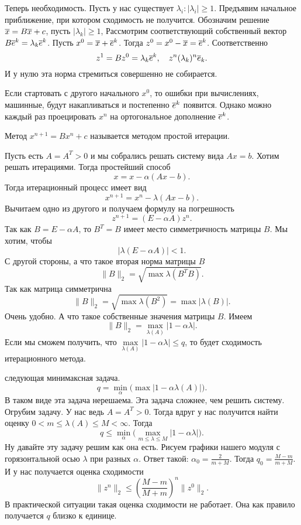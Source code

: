 \begin{Proof}
Теперь необходимость. Пусть у нас существует $\lambda_i\colon |\lambda_i|\ge 1$. Предъявим начальное приближение, при котором сходимость не получится. Обозначим решение $\overline{x} = B\overline{x} + c$, пусть $|\lambda_k|\ge 1$, Рассмотрим соответствующий собственный вектор $B\overline{e}^k = \lambda_k \overline{e}^k$. Пусть $x^0 = \overline{x} + \overline{e}^k$. Тогда $z^0 = x^0 - \overline{x} = \overline{e}^k$. Соответственно
\[
  z^1 = Bz^0 = \lambda_k \overline{e}^k,\quad z^n (\lambda_k)^n \overline{e}_k.
\]
И у нулю эта норма стремиться совершенно не собирается.

\end{Proof}
Если стартовать с другого начального $x^0$, то ошибки при вычислениях, машинные, будут накапливаться и постепенно $\overline{e}^k$ появится. Однако можно каждый раз проецировать $x^n$ на ортогональное дополнение $\overline{e}^k$.

Метод $x^{n+1} = Bx^n + c$ называется методом простой итерации.

Пусть есть $A = A^T>0$ и мы собрались решать систему вида $Ax = b$. Хотим решать итерациями. Тогда простейший способ
\[
  x = x - \alpha (Ax -b).
\]
Тогда итерационный процесс имеет вид
\[
  x^{n+1} = x^n - \lambda(Ax - b).
\]
Вычитаем одно из другого и получаем формулу на погрешность
\[
  z^{n+1} = (E- \alpha A)z^n.
\]
Так как $B = E-\alpha A$, то $B^T=B$ имеет место симметричность матрицы $B$. Мы хотим, чтобы
\[
  \big|\lambda(E-\alpha A)\big|<1.
\]
С другой стороны, а что такое вторая норма матрицы $B$
\[
  \|B\|_2 = \sqrt{\max\lambda(B^TB)}.
\]
Так как матрица симметрична
\[
  \|B\|_2 = \sqrt{\max\lambda(B^2)} = \max\big|\lambda(B)\big|.
\]
Очень удобно. А что такое собственные значения матрицы $B$. Имеем
\[
 \|B\|_2 = \max\limits_{\lambda(A)} |1-\alpha \lambda|.
\]
Если мы сможем получить, что $\max\limits_{\lambda(A)}|1-\alpha\lambda|\le q$, то будет сходимость итерационного метода.

 следующая минимаксная задача.
\[
  q = \min\limits_\alpha\bigg(\max\big|1-\alpha\lambda(A)\big|\bigg).
\]
В таком виде эта задача нерешаема. Эта задача сложнее, чем решить систему. Огрубим задачу. У нас ведь $A= A^T>0$. Тогда вдруг у нас получится найти оценку $0<m\le \lambda(A)\le M<\infty$. Тогда
\[
  q\le \min\limits_\alpha\bigg(\max\limits_{m\le \lambda \le M}\big|1-\alpha \lambda\big|\bigg).
\]
Ну давайте эту задачу решим как она есть. Рисуем графики нашего модуля с горязонтальной осью $\lambda$ при разных $\alpha$. Ответ такой: $\alpha_0 = \frac2{m+M}$. Тогда $q_0 = \frac{M-m}{m+M}$. И у нас получается оценка сходимости
\[
  \|z^n\|_2\le \left( \frac{M-m}{M+m} \right)^n\|z^0\|_2.
\]
В практической ситуации такая оценка сходимости не работает. Она как правило получается $q$ близко к единице.
